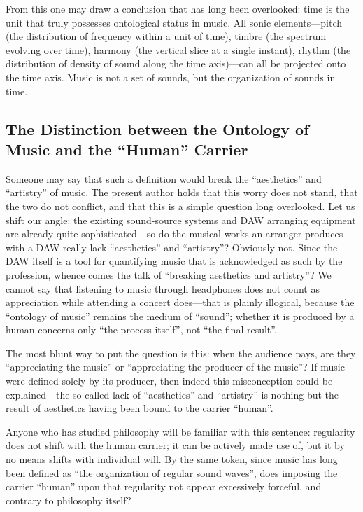 \documentclass[11pt,a4paper]{article}
\begin{document}
From this one may draw a conclusion that has long been overlooked: time is the unit that
truly possesses ontological status in music. All sonic elements---pitch (the distribution
of frequency within a unit of time), timbre (the spectrum evolving over time), harmony (the
vertical slice at a single instant), rhythm (the distribution of density of sound along
the time axis)---can all be projected onto the time axis. Music is not a set of sounds, but
the organization of sounds in time.

\subsection{The Distinction between the Ontology of Music and the ``Human'' Carrier}

Someone may say that such a definition would break the ``aesthetics'' and ``artistry'' of
music. The present author holds that this worry does not stand, that the two do not
conflict, and that this is a simple question long overlooked. Let us shift our angle: the
existing sound-source systems and DAW arranging equipment are already quite
sophisticated---so do the musical works an arranger produces with a DAW really lack
``aesthetics'' and ``artistry''? Obviously not. Since the DAW itself is a tool for
quantifying music that is acknowledged as such by the profession, whence comes the talk of
``breaking aesthetics and artistry''? We cannot say that listening to music through
headphones does not count as appreciation while attending a concert does---that is plainly
illogical, because the ``ontology of music'' remains the medium of ``sound''; whether it is
produced by a human concerns only ``the process itself'', not ``the final result''.

The most blunt way to put the question is this: when the audience pays, are they
``appreciating the music'' or ``appreciating the producer of the music''? If music were
defined solely by its producer, then indeed this misconception could be explained---the
so-called lack of ``aesthetics'' and ``artistry'' is nothing but the result of aesthetics
having been bound to the carrier ``human''.

Anyone who has studied philosophy will be familiar with this sentence: regularity does not
shift with the human carrier; it can be actively made use of, but it by no means shifts
with individual will. By the same token, since music has long been defined as ``the
organization of regular sound waves'', does imposing the carrier ``human'' upon that
regularity not appear excessively forceful, and contrary to philosophy itself?
\end{document}
